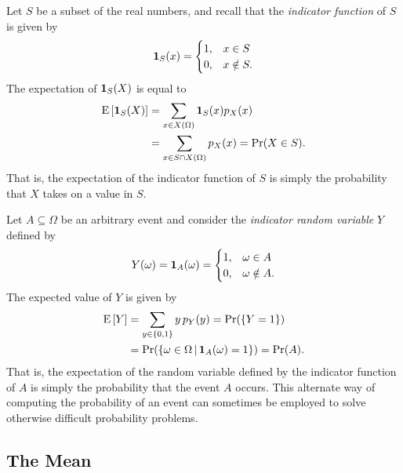 \begin{example}
Let $S$ be a subset of the real numbers, and recall that the \emph{indicator function} of $S$ is given by 
\begin{equation*}
\mathbf{1}_S (x) = \begin{cases} 1, & x \in S\\
0, & x \notin S . \end{cases}
\end{equation*}
The expectation of $\mathbf{1}_S (X)$ is equal to
\begin{equation*}
\begin{split}
\mathrm{E} \left[ \mathbf{1}_S (X) \right]
&= \sum_{x \in X(\Omega)} \mathbf{1}_S (x) p_X(x) \\
&= \sum_{x \in S \cap X(\Omega)} p_X(x)
= \Pr (X \in S) .
\end{split}
\end{equation*}
That is, the expectation of the indicator function of $S$ is simply the probability that $X$ takes on a value in $S$.
\end{example}

\begin{example}
Let $A\subseteq \Omega$ be an arbitrary event and consider the \emph{indicator random variable} $Y$ defined by
\begin{equation*}
Y(\omega) = \mathbf{1}_A (\omega) = \begin{cases} 1, & \omega \in A\\
0, & \omega \notin A. \end{cases}
\end{equation*}
The expected value of $Y$ is given by
\begin{equation*}
\begin{split}
\mathrm{E} \left[ Y \right]
&= \sum_{y \in \{0,1\}} y \, p_Y (y) = \Pr (\{Y = 1\}) \\
& = \Pr ( \{ \omega \in \Omega\, | \, \mathbf{1}_A (\omega) = 1 \} ) = \Pr (A ).
\end{split}
\end{equation*}
That is, the expectation of the random variable defined by the indicator function of $A$ is simply the probability that the event $A$ occurs.
This alternate way of computing the probability of an event can sometimes be employed to solve otherwise difficult probability problems.
\end{example}

\subsection{The Mean}


